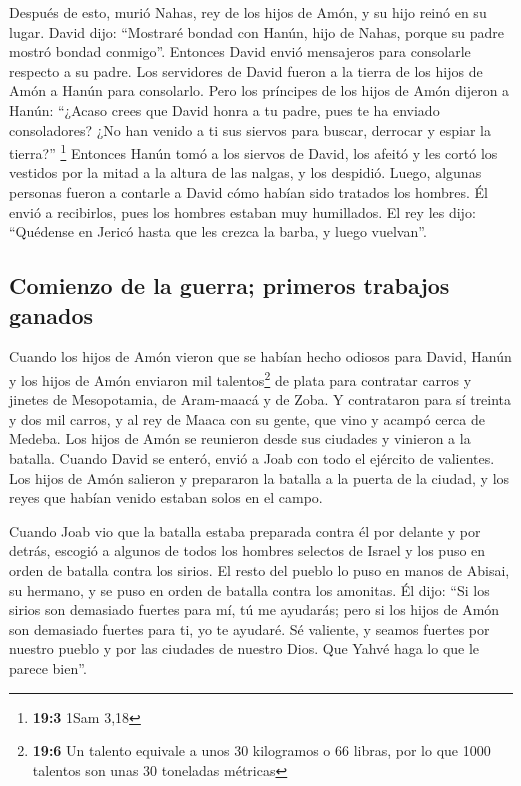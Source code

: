 \begin{paracol}{2}
 Después de esto, murió Nahas, rey de los hijos de Amón, y
su hijo reinó en su lugar.  David dijo: ``Mostraré bondad
con Hanún, hijo de Nahas, porque su padre mostró bondad conmigo''.
Entonces David envió mensajeros para consolarle respecto a su padre. Los
servidores de David fueron a la tierra de los hijos de Amón a Hanún para
consolarlo.  Pero los príncipes de los hijos de Amón
dijeron a Hanún: ``¿Acaso crees que David honra a tu padre, pues te ha
enviado consoladores? ¿No han venido a ti sus siervos para buscar,
derrocar y espiar la tierra?'' \footnote{\textbf{19:3} 1Sam 3,18}
 Entonces Hanún tomó a los siervos de David, los afeitó y
les cortó los vestidos por la mitad a la altura de las nalgas, y los
despidió.  Luego, algunas personas fueron a contarle a
David cómo habían sido tratados los hombres. Él envió a recibirlos, pues
los hombres estaban muy humillados. El rey les dijo: ``Quédense en
Jericó hasta que les crezca la barba, y luego vuelvan''.

\hypertarget{comienzo-de-la-guerra-primeros-trabajos-ganados}{%
\subsection{Comienzo de la guerra; primeros trabajos
ganados}\label{comienzo-de-la-guerra-primeros-trabajos-ganados}}

 Cuando los hijos de Amón vieron que se habían hecho
odiosos para David, Hanún y los hijos de Amón enviaron mil
talentos\footnote{\textbf{19:6} Un talento equivale a unos 30 kilogramos
  o 66 libras, por lo que 1000 talentos son unas 30 toneladas métricas}
de plata para contratar carros y jinetes de Mesopotamia, de Aram-maacá y
de Zoba.  Y contrataron para sí treinta y dos mil carros,
y al rey de Maaca con su gente, que vino y acampó cerca de Medeba. Los
hijos de Amón se reunieron desde sus ciudades y vinieron a la batalla.
 Cuando David se enteró, envió a Joab con todo el ejército
de valientes.  Los hijos de Amón salieron y prepararon la
batalla a la puerta de la ciudad, y los reyes que habían venido estaban
solos en el campo.

 Cuando Joab vio que la batalla estaba preparada contra
él por delante y por detrás, escogió a algunos de todos los hombres
selectos de Israel y los puso en orden de batalla contra los sirios.
 El resto del pueblo lo puso en manos de Abisai, su
hermano, y se puso en orden de batalla contra los amonitas.
 Él dijo: ``Si los sirios son demasiado fuertes para mí,
tú me ayudarás; pero si los hijos de Amón son demasiado fuertes para ti,
yo te ayudaré.  Sé valiente, y seamos fuertes por nuestro
pueblo y por las ciudades de nuestro Dios. Que Yahvé haga lo que le
parece bien''.


\end{paracol}
